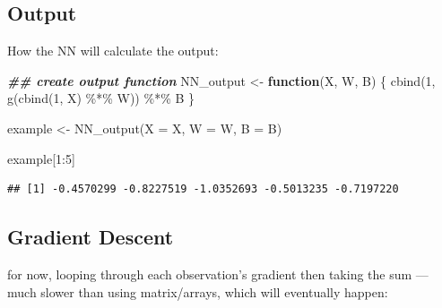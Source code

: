 \documentclass[
]{book}
\newenvironment{Shaded}{\begin{snugshade}}{\end{snugshade}}
\newcommand{\AttributeTok}[1]{\textcolor[rgb]{0.77,0.63,0.00}{#1}}
\newcommand{\ControlFlowTok}[1]{\textcolor[rgb]{0.13,0.29,0.53}{\textbf{#1}}}
\newcommand{\DecValTok}[1]{\textcolor[rgb]{0.00,0.00,0.81}{#1}}
\newcommand{\DocumentationTok}[1]{\textcolor[rgb]{0.56,0.35,0.01}{\textbf{\textit{#1}}}}
\newcommand{\FunctionTok}[1]{\textcolor[rgb]{0.00,0.00,0.00}{#1}}
\newcommand{\NormalTok}[1]{#1}
\newcommand{\OtherTok}[1]{\textcolor[rgb]{0.56,0.35,0.01}{#1}}
\newcommand{\SpecialCharTok}[1]{\textcolor[rgb]{0.00,0.00,0.00}{#1}}
\begin{document}
\hypertarget{output}{%
\subsection{Output}\label{output}}

How the NN will calculate the output:

\begin{Shaded}
\begin{Highlighting}[]
\DocumentationTok{\#\# create output function}
\NormalTok{NN\_output }\OtherTok{\textless{}{-}} \ControlFlowTok{function}\NormalTok{(X, W, B) \{}
  \FunctionTok{cbind}\NormalTok{(}\DecValTok{1}\NormalTok{, }\FunctionTok{g}\NormalTok{(}\FunctionTok{cbind}\NormalTok{(}\DecValTok{1}\NormalTok{, X) }\SpecialCharTok{\%*\%}\NormalTok{ W)) }\SpecialCharTok{\%*\%}\NormalTok{ B}
\NormalTok{\}}

\NormalTok{example }\OtherTok{\textless{}{-}} \FunctionTok{NN\_output}\NormalTok{(}\AttributeTok{X =}\NormalTok{ X,}
                     \AttributeTok{W =}\NormalTok{ W,}
                     \AttributeTok{B =}\NormalTok{ B)}

\NormalTok{example[}\DecValTok{1}\SpecialCharTok{:}\DecValTok{5}\NormalTok{]}
\end{Highlighting}
\end{Shaded}

\begin{verbatim}
## [1] -0.4570299 -0.8227519 -1.0352693 -0.5013235 -0.7197220
\end{verbatim}

\hypertarget{gradient-descent-1}{%
\subsection{Gradient Descent}\label{gradient-descent-1}}

for now, looping through each observation's gradient then taking the sum --- much slower than using matrix/arrays, which will eventually happen:
\end{document}
